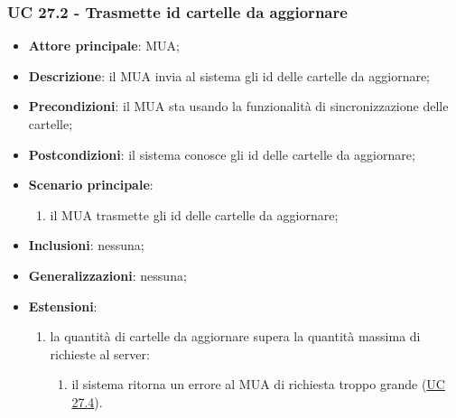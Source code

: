     \subsubsection{UC 27.2 - Trasmette id cartelle da aggiornare} \label{sec:UC27.2}
    \begin{itemize}
        \item \textbf{Attore principale}: MUA;
        \item \textbf{Descrizione}: il MUA invia al sistema gli id delle cartelle da aggiornare;
        \item \textbf{Precondizioni}: il MUA sta usando la funzionalità di sincronizzazione delle cartelle;
        \item \textbf{Postcondizioni}: il sistema conosce gli id delle cartelle da aggiornare;
        \item \textbf{Scenario principale}:
            \begin{enumerate}
                \item il MUA trasmette gli id delle cartelle da aggiornare;
            \end{enumerate}
        \item \textbf{Inclusioni}: nessuna;
        \item \textbf{Generalizzazioni}: nessuna;
        \item \textbf{Estensioni}:
            \begin{enumerate}[label=\alph*.]
                \item la quantità di cartelle da aggiornare supera la quantità massima di richieste al server:
                \begin{enumerate}[label=\arabic*.]
                    \item il sistema ritorna un errore al MUA di richiesta troppo grande (\hyperref[sec:UC27.4]{UC 27.4}).
                \end{enumerate}
            \end{enumerate}
    \end{itemize}


